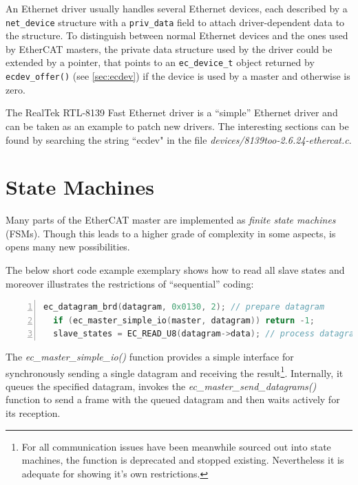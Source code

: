 \documentclass[a4paper,12pt,BCOR6mm,bibtotoc,idxtotoc]{scrbook}
\begin{document}
An Ethernet driver usually handles several Ethernet devices, each described by
a \lstinline+net_device+ structure with a \lstinline+priv_data+ field to
attach driver-dependent data to the structure. To distinguish between normal
Ethernet devices and the ones used by EtherCAT masters, the private data
structure used by the driver could be extended by a pointer, that points to an
\lstinline+ec_device_t+ object returned by \lstinline+ecdev_offer()+ (see
\autoref{sec:ecdev}) if the device is used by a master and otherwise is zero.

The RealTek RTL-8139 Fast Ethernet driver is a ``simple'' Ethernet driver and
can be taken as an example to patch new drivers. The interesting sections can
be found by searching the string ``ecdev" in the file
\textit{devices/8139too-2.6.24-ethercat.c}.


\chapter{State Machines}
\label{sec:fsm}

Many parts of the EtherCAT master are implemented as \textit{finite state
machines} (FSMs). Though this leads
to a higher grade of complexity in some aspects, is opens many new
possibilities.

The below short code example exemplary shows how to read all slave
states and moreover illustrates the restrictions of ``sequential''
coding:

\begin{lstlisting}[gobble=2,language=C,numbers=left]
  ec_datagram_brd(datagram, 0x0130, 2); // prepare datagram
  if (ec_master_simple_io(master, datagram)) return -1;
  slave_states = EC_READ_U8(datagram->data); // process datagram
\end{lstlisting}

The \textit{ec\_master\_simple\_io()} function provides a simple interface for
synchronously sending a single datagram and receiving the result\footnote{For
all communication issues have been meanwhile sourced out into state machines,
the function is deprecated and stopped existing. Nevertheless it is adequate
for showing it's own restrictions.}. Internally, it queues the specified
datagram, invokes the \textit{ec\_master\_send\_datagrams()} function to send
a frame with the queued datagram and then waits actively for its reception.
\end{document}
